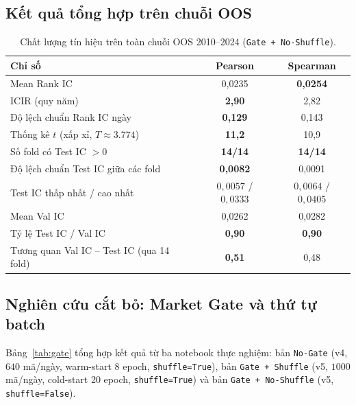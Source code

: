 \documentclass[a4paper,12pt]{article}
\begin{document}
\subsection{Kết quả tổng hợp trên chuỗi OOS}
\begin{table}[H]\centering\small
\caption{Chất lượng tín hiệu trên toàn chuỗi OOS 2010--2024 (\texttt{Gate + No-Shuffle}).}
\label{tab:agg}
\renewcommand{\arraystretch}{1.15}
\begin{tabular}{@{}lcc@{}}
\toprule
\textbf{Chỉ số} & \textbf{Pearson} & \textbf{Spearman}\\\midrule
Mean Rank IC & 0,0235 & \textbf{0,0254}\\
ICIR (quy năm) & \textbf{2,90} & 2,82\\
Độ lệch chuẩn Rank IC ngày & \textbf{0,129} & 0,143\\
Thống kê $t$ (xấp xỉ, $T\approx3.774$) & \textbf{11,2} & 10,9\\
Số fold có Test IC $>0$ & \textbf{14/14} & \textbf{14/14}\\
Độ lệch chuẩn Test IC giữa các fold & \textbf{0,0082} & 0,0091\\
Test IC thấp nhất / cao nhất & $0{,}0057$ / $0{,}0333$ & $0{,}0064$ / $0{,}0405$\\
Mean Val IC & 0,0262 & 0,0282\\
Tỷ lệ Test IC / Val IC & \textbf{0,90} & \textbf{0,90}\\
Tương quan Val IC -- Test IC (qua 14 fold) & \textbf{0,51} & 0,48\\
\bottomrule
\end{tabular}
\end{table}

\subsection{Nghiên cứu cắt bỏ: Market Gate và thứ tự batch}
Bảng~\ref{tab:gate} tổng hợp kết quả từ ba notebook thực nghiệm: bản \texttt{No-Gate} (v4, $640$ mã/ngày, warm-start 8 epoch, \texttt{shuffle=True}), bản \texttt{Gate + Shuffle} (v5, $1000$ mã/ngày, cold-start 20 epoch, \texttt{shuffle=True}) và bản \texttt{Gate + No-Shuffle} (v5, \texttt{shuffle=False}).
\end{document}
